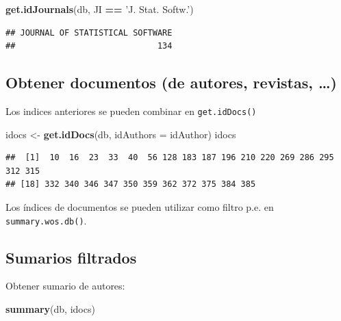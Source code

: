 \documentclass[]{book}
\newenvironment{Shaded}{\begin{snugshade}}{\end{snugshade}}
\newcommand{\DataTypeTok}[1]{\textcolor[rgb]{0.13,0.29,0.53}{#1}}
\newcommand{\KeywordTok}[1]{\textcolor[rgb]{0.13,0.29,0.53}{\textbf{#1}}}
\newcommand{\NormalTok}[1]{#1}
\newcommand{\OperatorTok}[1]{\textcolor[rgb]{0.81,0.36,0.00}{\textbf{#1}}}
\newcommand{\StringTok}[1]{\textcolor[rgb]{0.31,0.60,0.02}{#1}}
\begin{document}
\begin{itemize}
\begin{Shaded}
\begin{Highlighting}[]
\KeywordTok{get.idJournals}\NormalTok{(db, JI }\OperatorTok{==}\StringTok{ 'J. Stat. Softw.'}\NormalTok{)}
\end{Highlighting}
\end{Shaded}

\begin{verbatim}
## JOURNAL OF STATISTICAL SOFTWARE 
##                             134
\end{verbatim}
\end{itemize}

\hypertarget{obtener-documentos-de-autores-revistas}{%
\subsection{Obtener documentos (de autores, revistas, \ldots{})}\label{obtener-documentos-de-autores-revistas}}

Los indices anteriores se pueden combinar en \texttt{get.idDocs()}

\begin{Shaded}
\begin{Highlighting}[]
\NormalTok{idocs <-}\StringTok{ }\KeywordTok{get.idDocs}\NormalTok{(db, }\DataTypeTok{idAuthors =}\NormalTok{ idAuthor)}
\NormalTok{idocs}
\end{Highlighting}
\end{Shaded}

\begin{verbatim}
##  [1]  10  16  23  33  40  56 128 183 187 196 210 220 269 286 295 312 315
## [18] 332 340 346 347 350 359 362 372 375 384 385
\end{verbatim}

Los índices de documentos se pueden utilizar como filtro p.e. en \texttt{summary.wos.db()}.

\hypertarget{sumarios-filtrados}{%
\subsection{Sumarios filtrados}\label{sumarios-filtrados}}

Obtener sumario de autores:

\begin{Shaded}
\begin{Highlighting}[]
\KeywordTok{summary}\NormalTok{(db, idocs)}
\end{Highlighting}
\end{Shaded}
\end{document}
